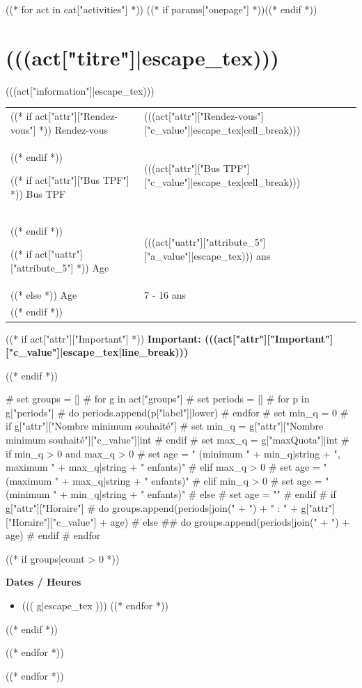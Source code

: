 \documentclass [parskip=full, paper=a4paper]{scrbook}
\begin{document}
((* for act in cat["activities"] *))
((* if params["onepage"] *))\newpage((* endif *))
\begin{minipage}[t]{\textwidth}%
\section{(((act["titre"]|escape_tex)))}

(((act["information"]|escape_tex)))
\medskip

\begin{tabulary}{0.9\textwidth}{p{2.5cm}|L}

((* if act["attr"]["Rendez-vous"] *))
Rendez-vous & (((act["attr"]["Rendez-vous"]["c_value"]|escape_tex|cell_break))) \\
((* endif *))

((* if act["attr"]["Bus TPF"] *))
Bus TPF & (((act["attr"]["Bus TPF"]["c_value"]|escape_tex|cell_break))) \\
((* endif *))

((* if act["uattr"]["attribute_5"] *))
Age & (((act["uattr"]["attribute_5"]["a_value"]|escape_tex))) ans \\
((* else *))
Age & 7 - 16 ans \\
((* endif *))

\end{tabulary}

((* if act["attr"]["Important"] *))
\medskip
\textbf{Important: (((act["attr"]["Important"]["c_value"]|escape_tex|line_break)))}

((* endif *))

# set groups = []
# for g in act["groups"]
#   set periods = []
#   for p in g["periods"]
#     do periods.append(p["label"]|lower)
#   endfor
#   set min_q = 0
#   if g["attr"]["Nombre minimum souhaité"]
#     set min_q = g["attr"]["Nombre minimum souhaité"]["c_value"]|int
#   endif
#   set max_q = g["maxQuota"]|int
#   if min_q > 0 and max_q > 0
#     set age = " (minimum " + min_q|string + ", maximum " + max_q|string + " enfants)"
#   elif max_q > 0
#     set age = " (maximum " + max_q|string + " enfants)"
#   elif min_q > 0
#     set age = " (minimum " + min_q|string + " enfants)"
#   else
#     set age = ""
#   endif
#   if g["attr"]["Horaire"]
#     do groups.append(periods|join(" + ") + " : " + g["attr"]["Horaire"]["c_value"] + age)
#   else
##    do groups.append(periods|join(" + ") + age)
#   endif
# endfor

((* if groups|count > 0 *))
\medskip

\textbf{Dates / Heures}
\medskip

\begin{itemize}[noitemsep]
((* for g in groups *))
\item ((( g|escape_tex )))
((* endfor *))
\end{itemize}
((* endif *))
\end{minipage}
((* endfor *))


((* endfor *))
\end{document}
